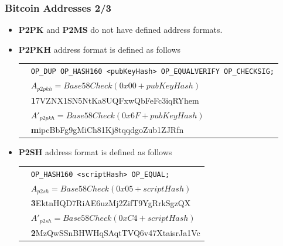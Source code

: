 \documentclass{beamer}
\begin{document}
\begin{frame}
  \frametitle{Bitcoin Addresses 2/3}
  \begin{itemize}
  \item \textbf{P2PK} and \textbf{P2MS} do not have defined address formats.
  \item \textbf{P2PKH} address format is defined as follows
    \break
    \begin{tabular}{rl}
      &\tiny\texttt{OP_DUP OP_HASH160 <pubKeyHash>
        OP_EQUALVERIFY OP_CHECKSIG;} \\
      &${\scriptstyle A_{\mathit{p2pkh}} = \mathit{Base58Check}(0x00 +
        pubKeyHash)}$ \\
      &{\scriptsize \quad\quad\quad \textbf{1}7VZNX1SN5NtKa8UQFxwQbFeFc3iqRYhem} \\
      &${\scriptstyle A'_{\mathit{p2pkh}} = \mathit{Base58Check}(0x6F +
        pubKeyHash)}$ \\
      &{\scriptsize \quad\quad\quad \textbf{m}ipcBbFg9gMiCh81Kj8tqqdgoZub1ZJRfn} \\
    \end{tabular}
  \item \textbf{P2SH} address format is defined as follows
    \break
    \begin{tabular}{rl}
      &\tiny\texttt{OP_HASH160 <scriptHash> OP_EQUAL;} \\
      &${\scriptstyle A_{\mathit{p2sh}} = \mathit{Base58Check}(0x05 +
        scriptHash)}$ \\
      &{\scriptsize \quad\quad\quad \textbf{3}EktnHQD7RiAE6uzMj2ZifT9YgRrkSgzQX} \\
      &${\scriptstyle A'_{\mathit{p2sh}} = \mathit{Base58Check}(0xC4 +
        scriptHash)}$ \\
      &{\scriptsize \quad\quad\quad \textbf{2}MzQwSSnBHWHqSAqtTVQ6v47XtaisrJa1Vc} \\
    \end{tabular}
  \end{itemize}
\end{frame}
\end{document}
